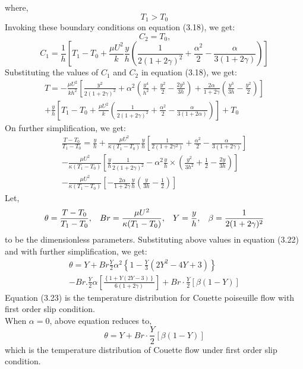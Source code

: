 \documentclass[14pt,one side, a4paper]{extbook}
\begin{document}
	 	where, $$T_{1}>T_{0}$$Invoking these boundary conditions on equation (3.18), we get:
	 	$$C_{2}=T_{0}\textrm{,}$$
	 	\begin{equation}
	 		C_{1}=\frac{1}{h}\left[T_{1}-T_{0}+\frac{\mu U^{2}}{k}\frac{y}{h}\left(\frac{1}{2(1+2\gamma)^{2}}+\frac{\alpha^{2}}{2}-\frac{\alpha}{3(1+2\gamma)}\right)\right]
	 	\end{equation} 
	 	Substituting the values of $C_{1}$ and $C_{2}$ in equation (3.18), we get:
	 	\begin{equation}
	 		\begin{split}
	 		T=-\frac{\mu U^{2}}{kh^{2}}\left[\frac{y^{2}}{2(1+2\gamma )^{2}}+\alpha ^{2}\left(\frac{y^{4}}{h^{2}}+\frac{y^{2}}{2}-\frac{2y^{3}}{3h}\right)+\frac{2\alpha}{1+2\gamma}\left(\frac{y^{3}}{3h}-\frac{y^{2}}{2}\right)\right]\\+\frac{y}{h}\left[T_{1}-T_{0} + \frac{\mu U^{2}}{k}\left( \frac{1}{2(1+2\gamma)^{2}}+\frac{\alpha^{2}}{2}-\frac{\alpha}{3(1+2\alpha)}\right) \right]+T_{0}
	 		\end{split}
	 	\end{equation}
	 	On further simplification, we get:
	 	\begin{multline}
	 		\frac{T-T_{0}}{T_{1}-T_{0}}=\frac{y}{h}+\frac{\mu U^{2}}{\kappa(T_{1}-T_{0})}\frac{y}{h}\left[\frac{1}{2(1+2\gamma ^{2})}+\frac{\alpha^{2}}{2}-\frac{\alpha}{3(1+2\gamma)}\right]\\-\frac{\mu U^{2}}{\kappa(T_{1}-T_{0})}\left[\frac{y}{h}\frac{1}{2(1+2\gamma)^{2}} -\alpha^{2}\frac{y}{h} \times \left(\frac{y^{2}}{3h^{2}}+\frac{1}{2}-\frac{2y}{3h}\right)\right] \\-\frac{\mu U^{2}}{\kappa(T_{1}-T_{0})}\left[ -\frac{2\alpha}{1+2\gamma}\frac{y}{h}\left(\frac{y}{3h}-\frac{1}{2}\right)\right]
	 	\end{multline}
	 	Let,$$\theta=\frac{T-T_{0}}{T_{1}-T_{0}},\hspace*{0.3cm}Br=\frac{\mu U^{2}}{\kappa(T_{1}-T_{0})},\hspace*{0.3cm}Y=\frac{y}{h},\hspace*{0.3cm}\beta=\frac{1}{2(1+2\gamma)^{2}}$$
	 	to be the dimensionless parameters. Substituting above values in equation (3.22) and with further simplification, we get:
	 	\begin{multline}
	 		\theta=Y+Br\frac{Y}{2}\alpha^{2}\left\{1-\frac{Y}{3}\left(2Y^{2}-4Y+3\right)\right\}\\-Br.\frac{Y}{2}\alpha\left[\frac{\left\{1+Y(2Y-3)\right\}}{6(1+2\gamma)}\right]+Br\cdot\frac{Y}{2}[\beta(1-Y)]
	 	\end{multline}
	 	Equation (3.23) is the temperature distribution for Couette poiseuille flow with first order slip condition.\\When $\alpha=0$, above equation reduces to,
	 	\begin{equation}
	 		\theta=Y+Br\cdot\frac{Y}{2}[\beta(1-Y)]
	 	\end{equation}
	 	which is the temperature distribution of Couette flow under first order slip condition.
\end{document}
